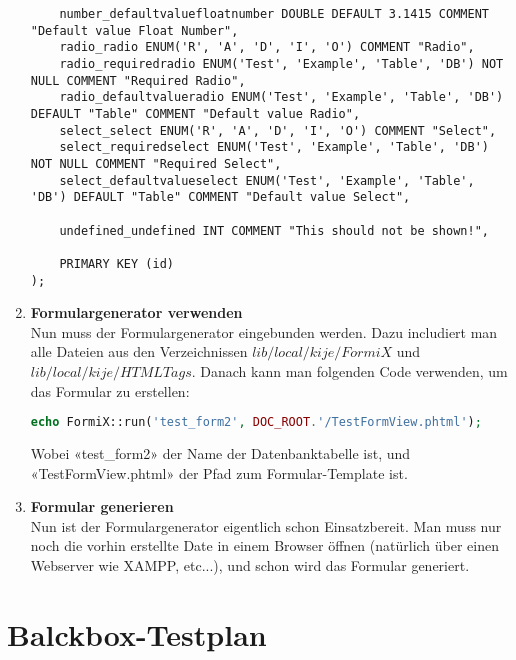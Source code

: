 \documentclass[11pt,a4paper,titlepage,portrait,ngerman]{scrartcl}
\begin{document}
\begin{enumerate}
{{\begin{lstlisting}
    number_defaultvaluefloatnumber DOUBLE DEFAULT 3.1415 COMMENT "Default value Float Number",
    radio_radio ENUM('R', 'A', 'D', 'I', 'O') COMMENT "Radio",
    radio_requiredradio ENUM('Test', 'Example', 'Table', 'DB') NOT NULL COMMENT "Required Radio",
    radio_defaultvalueradio ENUM('Test', 'Example', 'Table', 'DB') DEFAULT "Table" COMMENT "Default value Radio",
    select_select ENUM('R', 'A', 'D', 'I', 'O') COMMENT "Select",
    select_requiredselect ENUM('Test', 'Example', 'Table', 'DB') NOT NULL COMMENT "Required Select",
    select_defaultvalueselect ENUM('Test', 'Example', 'Table', 'DB') DEFAULT "Table" COMMENT "Default value Select",

    undefined_undefined INT COMMENT "This should not be shown!",

    PRIMARY KEY (id)
);
		\end{lstlisting}  }
		
	} 
	\item{\textbf{Formulargenerator verwenden} \\
		Nun muss der Formulargenerator eingebunden werden. Dazu includiert man alle Dateien aus den Verzeichnissen $lib/local/kije/FormiX$ und $lib/local/kije/HTMLTags$. Danach kann man folgenden Code verwenden, um das Formular zu erstellen:
		\par
		\small{\begin{lstlisting}[language=PHP] 
echo FormiX::run('test_form2', DOC_ROOT.'/TestFormView.phtml');
		\end{lstlisting}  }
	 \par
	Wobei «test\_form2» der Name der Datenbanktabelle ist, und «TestFormView.phtml» der Pfad zum Formular-Template ist.}
	
	\item{\textbf{Formular generieren} \\
		Nun ist der Formulargenerator eigentlich schon Einsatzbereit. Man muss nur noch die vorhin erstellte Date in einem Browser öffnen (natürlich über einen Webserver wie XAMPP, etc...), und schon wird das Formular generiert.	
		}
\end{enumerate}

\newpage
\section{Balckbox-Testplan}
\end{document}
